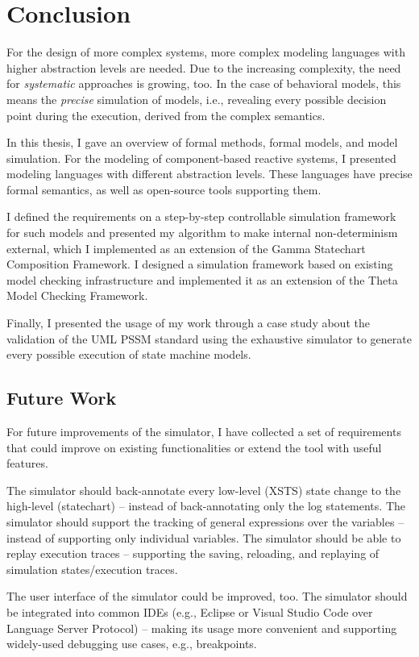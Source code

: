\chapter{Conclusion} \label{conclusion}

For the design of more complex systems, more complex modeling languages with higher abstraction levels are needed. Due to the increasing complexity, the need for \textit{systematic} approaches is growing, too. In the case of behavioral models, this means the \textit{precise} simulation of models, i.e., revealing every possible decision point during the execution, derived from the complex semantics.

In this thesis, I gave an overview of formal methods, formal models, and model simulation. For the modeling of component-based reactive systems, I presented modeling languages with different abstraction levels. These languages have precise formal semantics, as well as open-source tools supporting them.

I defined the requirements on a step-by-step controllable simulation framework for such models and presented my algorithm to make internal non-determinism external, which I implemented as an extension of the Gamma Statechart Composition Framework. I designed a simulation framework based on existing model checking infrastructure and implemented it as an extension of the Theta Model Checking Framework.

Finally, I presented the usage of my work through a case study about the validation of the UML PSSM standard using the exhaustive simulator to generate every possible execution of state machine models.

\section{Future Work} \label{future-work}

For future improvements of the simulator, I have collected a set of requirements that could improve on existing functionalities or extend the tool with useful features.

The simulator should back-annotate every low-level (XSTS) state change to the high-level (statechart) -- instead of back-annotating only the log statements. The simulator should support the tracking of general expressions over the variables -- instead of supporting only individual variables. The simulator should be able to replay execution traces -- supporting the saving, reloading, and replaying of simulation states/execution traces.

The user interface of the simulator could be improved, too. The simulator should be integrated into common IDEs (e.g., Eclipse or Visual Studio Code over Language Server Protocol) -- making its usage more convenient and supporting widely-used debugging use cases, e.g., breakpoints.
